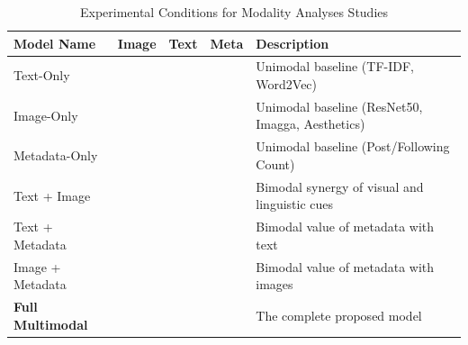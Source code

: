 \begin{table}[H]
	\centering
	\caption{Experimental Conditions for Modality Analyses Studies}
	\label{tab:ablation_conditions}
	\begin{tabularx}{\textwidth}{l c c c X} 
		\hline
		\textbf{Model Name} & \textbf{Image} & \textbf{Text} & \textbf{Meta} & \textbf{Description} \\ \hline
		Text-Only & & \checkmark & & Unimodal baseline (TF-IDF, Word2Vec) \\
		Image-Only & \checkmark & & & Unimodal baseline (ResNet50, Imagga, Aesthetics) \\
		Metadata-Only & & & \checkmark & Unimodal baseline (Post/Following Count) \\
		Text + Image & \checkmark & \checkmark & & Bimodal synergy of visual and linguistic cues \\
		Text + Metadata & & \checkmark & \checkmark & Bimodal value of metadata with text \\
		Image + Metadata & \checkmark & & \checkmark & Bimodal value of metadata with images \\
		\textbf{Full Multimodal} & \checkmark & \checkmark & \checkmark & The complete proposed model \\ \hline
	\end{tabularx}
\end{table}
